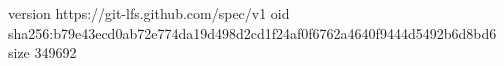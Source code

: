 version https://git-lfs.github.com/spec/v1
oid sha256:b79e43ecd0ab72e774da19d498d2cd1f24af0f6762a4640f9444d5492b6d8bd6
size 349692
